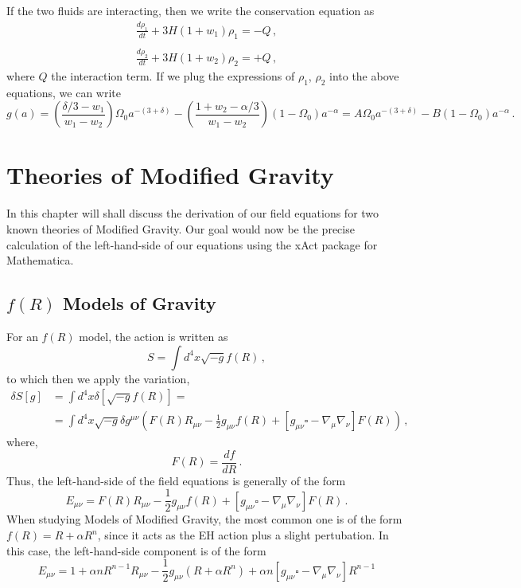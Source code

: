 \documentclass{book}
\begin{document}
	If the two fluids are interacting, then we write the conservation equation as
	\begin{equation}
		\begin{array}{c}
			\frac{d\rho_1}{dt}+3H(1+w_1)\rho_1=-Q \, , \\ \, \\
			\frac{d\rho_2}{dt}+3H(1+w_2)\rho_2=+Q \, ,
		\end{array}
	\end{equation}
	where $Q$ the interaction term. If we plug the expressions of $\rho_1$, $\rho_2$ into the above equations, we can write
	\begin{equation}
		g(a)=\left( \frac{\delta/3-w_1}{w_1-w_2} \right) \Omega_0 a^{-(3+\delta)}- \left( \frac{1+w_2-\alpha/3}{w_1-w_2} \right) (1-\Omega_0)a^{-\alpha} = A\Omega_0 a^{-(3+\delta)}-B(1-\Omega_0)a^{-\alpha} \, . 
	\end{equation}
	
	\chapter{Theories of Modified Gravity}
	In this chapter will shall discuss the derivation of our field equations for two known theories of Modified Gravity. Our goal would now be the precise calculation of the left-hand-side of our equations using the xAct package for Mathematica.
	\section{$f(R)$ Models of Gravity}
	For an $f(R)$ model, the action is written as
	\begin{equation}
		\label{f(R)_action}
		S=\int d^4x \sqrt{-g} f(R) \, ,
	\end{equation}
	to which then we apply the variation,
	\begin{equation}
		\begin{aligned}
			\delta S \left[ g \right] &= \int d^4x \delta \left[  \sqrt{-g}f(R)  \right]= \\
			\, & = \int d^4x \sqrt{-g}\delta g^{\mu\nu}\left( F(R)R_{\mu\nu} -\frac12 g_{\mu\nu}f(R) + \left[ g_{\mu\nu} \square  - \nabla_{\mu}\nabla_\nu \right] F(R) \right) \, ,
		\end{aligned}
	\end{equation}
	where,
	\begin{equation*}
		  F(R) = \frac{df}{dR} \, .
	\end{equation*}
	Thus, the left-hand-side of the field equations is generally of the form
	\begin{equation}
		E_{\mu\nu} = F(R)R_{\mu\nu} -\frac12 g_{\mu\nu}f(R) + \left[ g_{\mu\nu} \square  - \nabla_{\mu}\nabla_\nu \right] F(R) \, .
	\end{equation}
	When studying Models of Modified Gravity, the most common one is of the form $f(R)=R+\alpha R^n$, since it acts as the EH action plus a slight pertubation. In this case, the left-hand-side component is of the form
	\begin{equation}
		E_{\mu\nu}=1+\alpha n R^{n-1}R_{\mu\nu}-\frac12 g_{\mu\nu}\left( R+\alpha R^n \right) + \alpha n \left[ g_{\mu\nu}\square - \nabla_\mu \nabla_\nu \right] R^{n-1}
	\end{equation}
\end{document}
